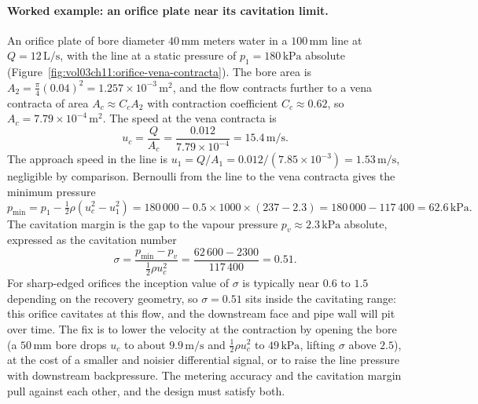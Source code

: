 \paragraph{Worked example: an orifice plate near its cavitation
limit.} An orifice plate of bore diameter $40\,\si{\milli\meter}$
meters water in a $100\,\si{\milli\meter}$ line at $Q =
12\,\text{L/s}$, with the line at a static pressure of $p_1 =
180\,\text{kPa}$ absolute (Figure~\ref{fig:vol03ch11:orifice-vena-contracta}).
The bore area is $A_2 = \tfrac{\pi}{4}(0.04)^2 = 1.257\times
10^{-3}\,\si{\meter}^2$, and the flow contracts further to a vena
contracta of area $A_c \approx C_c A_2$ with contraction coefficient
$C_c \approx 0.62$, so $A_c = 7.79\times 10^{-4}\,\si{\meter}^2$. The
speed at the vena contracta is
\[
u_c = \frac{Q}{A_c} = \frac{0.012}{7.79\times 10^{-4}}
= 15.4\,\si{\meter\per\second}.
\]
The approach speed in the line is $u_1 = Q/A_1 = 0.012/(7.85\times
10^{-3}) = 1.53\,\si{\meter\per\second}$, negligible by comparison.
Bernoulli from the line to the vena contracta gives the minimum
pressure
\[
p_\text{min} = p_1 - \tfrac12\rho(u_c^2 - u_1^2)
= 180\,000 - 0.5\times 1000\times(237 - 2.3)
= 180\,000 - 117\,400 = 62.6\,\text{kPa}.
\]
The cavitation margin is the gap to the vapour pressure $p_v \approx
2.3\,\text{kPa}$ absolute, expressed as the cavitation number
\[
\sigma = \frac{p_\text{min} - p_v}{\tfrac12\rho u_c^2}
= \frac{62\,600 - 2300}{117\,400} = 0.51.
\]
For sharp-edged orifices the inception value of $\sigma$ is typically
near $0.6$ to $1.5$ depending on the recovery geometry, so $\sigma =
0.51$ sits inside the cavitating range: this orifice cavitates at this
flow, and the downstream face and pipe wall will pit over time. The
fix is to lower the velocity at the contraction by opening the bore
(a $50\,\si{\milli\meter}$ bore drops $u_c$ to about
$9.9\,\si{\meter\per\second}$ and $\tfrac12\rho u_c^2$ to
$49\,\text{kPa}$, lifting $\sigma$ above $2.5$), at the cost of a
smaller and noisier differential signal, or to raise the line
pressure with downstream backpressure. The metering accuracy and the
cavitation margin pull against each other, and the design must satisfy
both.

